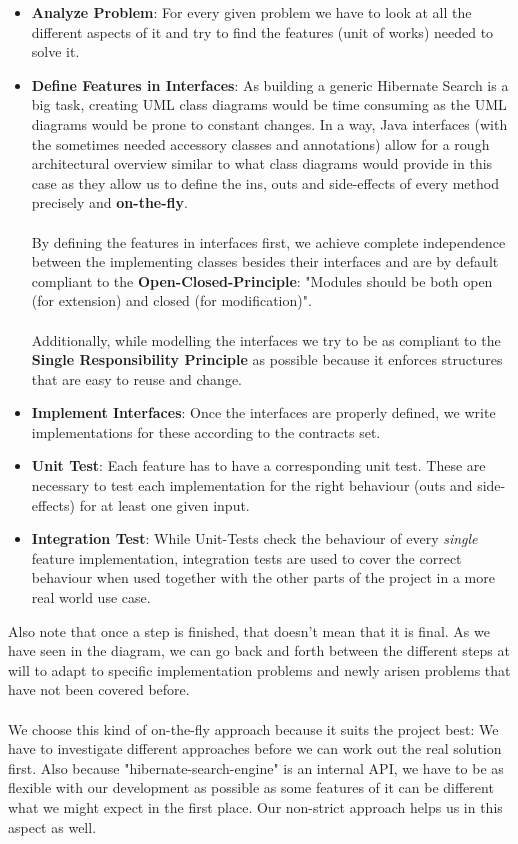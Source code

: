\begin{itemize}
	\item \textbf{Analyze Problem}: For every given problem we have to look at all the different aspects of it and try to find the features (unit of works) needed to solve it.
	\item \textbf{Define Features in Interfaces}: As building a generic Hibernate Search is a big task, creating UML class diagrams would be time consuming as the UML diagrams would be prone to constant changes. In a way, Java interfaces (with the sometimes needed accessory classes and annotations) allow for a rough architectural overview similar to what class diagrams would provide in this case as they allow us to define the ins, outs and side-effects of every method precisely and \textbf{on-the-fly}.
	\\\\
	By defining the features in interfaces first, we achieve complete independence between the implementing classes besides their interfaces and are by default compliant to the \textbf{Open-Closed-Principle}: "Modules should be both open (for extension) and closed (for modification)".
	\\\\
	Additionally, while modelling the interfaces we try to be as compliant to the \textbf{Single Responsibility Principle} as possible because it enforces structures that are easy to reuse and change.
	\item \textbf{Implement Interfaces}: Once the interfaces are properly defined, we write implementations for these according to the contracts set.
	\item \textbf{Unit Test}: Each feature has to have a corresponding unit test. These are necessary to test each implementation for the right behaviour (outs and side-effects) for at least one given input.
	\item \textbf{Integration Test}: While Unit-Tests check the behaviour of every \textit{single} feature implementation, integration tests are used to cover the correct behaviour when used together with the other parts of the project in a more real world use case.
\end{itemize}
\noindent
Also note that once a step is finished, that doesn't mean that it is final. As we have seen in the diagram, we can go back and forth between the different steps at will to adapt to specific implementation problems and newly arisen problems that have not been covered before.
\\\\
We choose this kind of on-the-fly approach because it suits the project best: We have to investigate different approaches before we can work out the real solution first. Also because "hibernate-search-engine" is an internal API, we have to be as flexible with our development as possible as some features of it can be different what we might expect in the first place. Our non-strict approach helps us in this aspect as well.

\pagebreak
